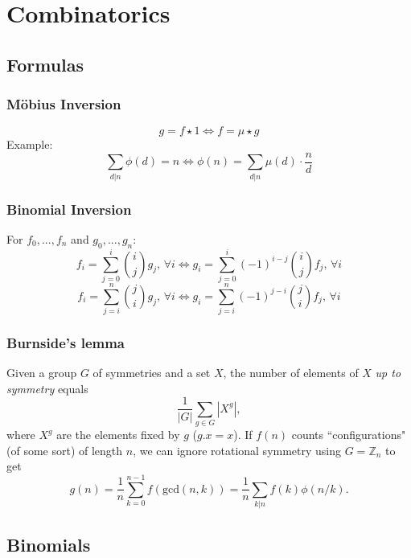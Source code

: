 \chapter{Combinatorics}
\begin{compactmath}
\section{Formulas}
\subsection{Möbius Inversion}
$$
g = f \star 1 \Leftrightarrow f= \mu \star g
$$
Example:
$$
\sum_{d|n} \phi(d)=n \Leftrightarrow \phi(n)=\sum_{d|n}\mu(d)\cdot \frac{n}{d}
$$

\subsection{Binomial Inversion}
For $f_0, ..., f_n$ and $g_0, ..., g_n$:
$$
f_i = \sum_{j = 0}^i \binom{i}{j} g_j,\, \forall i \Leftrightarrow g_i = \sum_{j = 0}^i (-1)^{i - j} \binom{i}{j} f_j,\, \forall i
$$
$$
f_i = \sum_{j = i}^n \binom{j}{i} g_j,\, \forall i \Leftrightarrow g_i = \sum_{j = i}^n (-1)^{j - i} \binom{j}{i} f_j,\, \forall i
$$

\subsection{Burnside's lemma} %
Given a group $G$ of symmetries and a set $X$, the number of elements of $X$ \emph{up to symmetry} equals
\[ {\frac {1}{|G|}}\sum _{{g\in G}}|X^{g}|, \]
where $X^{g}$ are the elements fixed by $g$ ($g.x = x$).
If $f(n)$ counts ``configurations" (of some sort) of length $n$, we can ignore rotational symmetry using $G = \mathbb Z_n$ to get
\[ g(n) = \frac 1 n \sum_{k=0}^{n-1}{f(\text{gcd}(n, k))} = \frac 1 n \sum_{k|n}{f(k)\phi(n/k)}. \]

\end{compactmath}
\section{Binomials}

